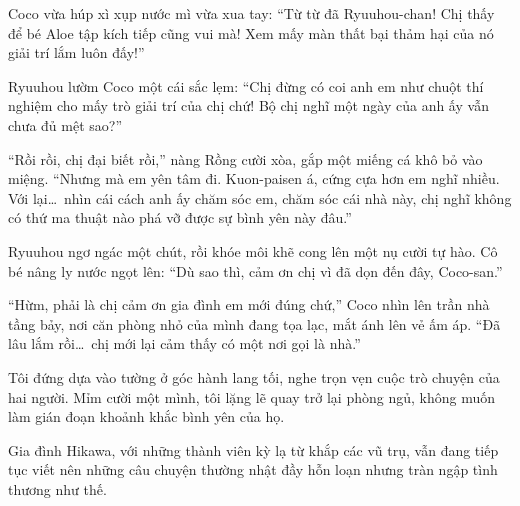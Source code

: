 \documentclass[../main.tex]{subfiles}
\begin{document}
Coco vừa húp xì xụp nước mì vừa xua tay: ``Từ từ đã Ryuuhou-chan! Chị thấy để bé Aloe tập kích tiếp cũng vui mà! Xem mấy màn thất bại thảm hại của nó giải trí lắm luôn đấy!''

Ryuuhou lườm Coco một cái sắc lẹm: ``Chị đừng có coi anh em như chuột thí nghiệm cho mấy trò giải trí của chị chứ! Bộ chị nghĩ một ngày của anh ấy vẫn chưa đủ mệt sao?''

``Rồi rồi, chị đại biết rồi,'' nàng Rồng cười xòa, gắp một miếng cá khô bỏ vào miệng. ``Nhưng mà em yên tâm đi. Kuon-paisen á, cứng cựa hơn em nghĩ nhiều. Với lại\dots\ nhìn cái cách anh ấy chăm sóc em, chăm sóc cái nhà này, chị nghĩ không có thứ ma thuật nào phá vỡ được sự bình yên này đâu.''

Ryuuhou ngơ ngác một chút, rồi khóe môi khẽ cong lên một nụ cười tự hào. Cô bé nâng ly nước ngọt lên: ``Dù sao thì, cảm ơn chị vì đã dọn đến đây, Coco-san.''

``Hừm, phải là chị cảm ơn gia đình em mới đúng chứ,'' Coco nhìn lên trần nhà tầng bảy, nơi căn phòng nhỏ của mình đang tọa lạc, mắt ánh lên vẻ ấm áp. ``Đã lâu lắm rồi\dots\ chị mới lại cảm thấy có một nơi gọi là nhà.''

Tôi đứng dựa vào tường ở góc hành lang tối, nghe trọn vẹn cuộc trò chuyện của hai người. Mỉm cười một mình, tôi lặng lẽ quay trở lại phòng ngủ, không muốn làm gián đoạn khoảnh khắc bình yên của họ.

Gia đình Hikawa, với những thành viên kỳ lạ từ khắp các vũ trụ, vẫn đang tiếp tục viết nên những câu chuyện thường nhật đầy hỗn loạn nhưng tràn ngập tình thương như thế.
\end{document}
